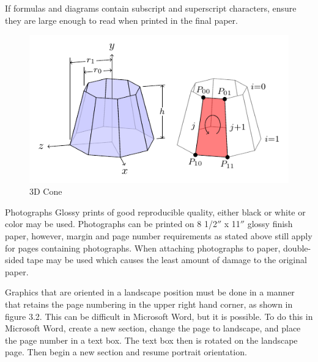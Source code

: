 \documentclass[12pt]{report}
\begin{document}
If formulas and diagrams contain subscript and superscript characters, ensure they are large enough to read when printed in the final paper. 

\begin{figure}[htp]
\centering
\includegraphics{3d-cone.pdf}
\caption{3D Cone}\label{fig:3d-cone}
\end{figure}

Photographs
Glossy prints of good reproducible quality, either black or white or color may be used. Photographs can be printed on 8 1/2$''$ x 11$''$ glossy finish paper, however, margin and page number requirements as stated above still apply for pages containing photographs. When attaching photographs to paper, double-sided tape may be used which causes the least amount of damage to the original paper. 

Graphics that are oriented in a landscape position must be done in a manner that retains the page numbering in the upper right hand corner, as shown in figure 3.2.  This can be difficult in Microsoft Word, but it is possible.  To do this in Microsoft Word, create a new section, change the page to landscape, and place the page number in a text box.  The text box then is rotated on the landscape page.    Then begin a new section and resume portrait orientation.
\end{document}
